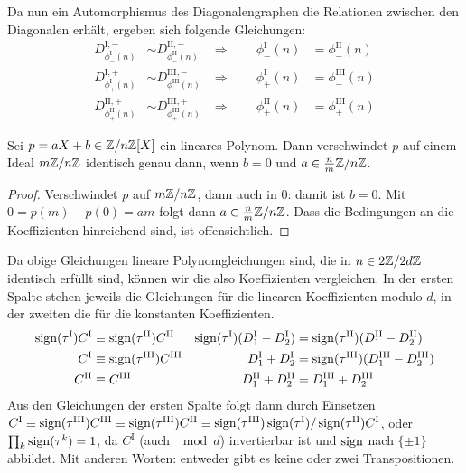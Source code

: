 Da nun ein Automorphismus des Diagonalengraphen die Relationen zwischen den Diagonalen erhält, ergeben sich folgende Gleichungen:
\begin{align*}
D_{\phi_-^\mathrm{I}(n)}^{\mathrm{I},-} &\sim D_{\phi_-^\mathrm{II}(n)}^{\mathrm{II},-}
	&\Longrightarrow\qquad \phi_-^\mathrm{I}(n) &= \phi_-^\mathrm{II}(n) \\
D_{\phi_+^\mathrm{I}(n)}^{\mathrm{I},+} &\sim D_{\phi_-^\mathrm{III}(n)}^{\mathrm{III},-}
	&\Longrightarrow\qquad \phi_+^\mathrm{I}(n) &= \phi_-^\mathrm{III}(n) \\
D_{\phi_+^\mathrm{II}(n)}^{\mathrm{II},+} &\sim D_{\phi_+^\mathrm{III}(n)}^{\mathrm{III},+}
	&\Longrightarrow\qquad \phi_+^\mathrm{II}(n) &= \phi_+^\mathrm{III}(n)
\end{align*}
\begin{prop}
Sei $p = aX+b \in \Zmod nZ[X]$ ein lineares Polynom. Dann verschwindet $p$ auf einem Ideal $m\Zmod nZ$ identisch genau dann, wenn $b=0$ und $a \in \frac n m \Zmod nZ$.
\end{prop}
\begin{proof}
Verschwindet $p$ auf $m\Zmod nZ$, dann auch in $0$: damit ist $b=0$. Mit $0 = p(m) - p(0) = am$ folgt dann $a \in \frac n m \Zmod nZ$. Dass die Bedingungen an die Koeffizienten hinreichend sind, ist offensichtlich.
\end{proof}
Da obige Gleichungen lineare Polynomgleichungen sind, die in $n \in 2\Zmod 2dZ$ identisch erfüllt sind, können wir die also Koeffizienten vergleichen. In der ersten Spalte stehen jeweils die Gleichungen für die linearen Koeffizienten modulo $d$, in der zweiten die für die konstanten Koeffizienten.
\begin{align*}
\operatorname{sign}(\tau^\mathrm{I}) C^\mathrm{I} &\equiv \operatorname{sign}(\tau^\mathrm{II}) C^\mathrm{II}
& \operatorname{sign}(\tau^\mathrm{I}) (D_1^\mathrm{I} - D_2^\mathrm{I}) &= \operatorname{sign}(\tau^\mathrm{II}) (D_1^\mathrm{II} - D_2^\mathrm{II}) \\
C^\mathrm{I} &\equiv \operatorname{sign}(\tau^\mathrm{III}) C^\mathrm{III}
& D_1^\mathrm{I} + D_2^\mathrm{I} &= \operatorname{sign}(\tau^\mathrm{III}) (D_1^\mathrm{III} - D_2^\mathrm{III}) \\
C^\mathrm{II} &\equiv C^\mathrm{III}
& D_1^\mathrm{II} + D_2^\mathrm{II} &= D_1^\mathrm{III} + D_2^\mathrm{III}
\end{align*}
Aus den Gleichungen der ersten Spalte folgt dann durch Einsetzen $C^\mathrm{I} \equiv \operatorname{sign}(\tau^\mathrm{III}) C^\mathrm{III} \equiv \operatorname{sign}(\tau^\mathrm{III}) C^\mathrm{II} \equiv \operatorname{sign}(\tau^\mathrm{III})\operatorname{sign}(\tau^\mathrm{I}) / \operatorname{sign}(\tau^\mathrm{II}) C^\mathrm{I}$, oder $\prod_k \operatorname{sign}(\tau^k) = 1$, da $C^\mathrm{I}$ (auch $\mod d$) invertierbar ist und $\operatorname{sign}$ nach $\{\pm 1\}$ abbildet. Mit anderen Worten: entweder gibt es keine oder zwei Transpositionen.

